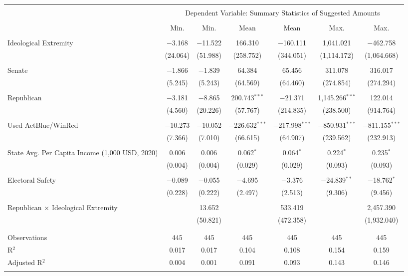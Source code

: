 
\begin{tabular}{@{\extracolsep{5pt}}lcccccc} 
\\[-1.8ex]\hline 
\hline \\[-1.8ex] 
 & \multicolumn{6}{c}{Dependent Variable: Summary Statistics of Suggested Amounts} \\ 
\cline{2-7} 
\\[-1.8ex] & Min. & Min. & Mean & Mean & Max. & Max. \\ 
\hline \\[-1.8ex] 
 Ideological Extremity & $-$3.168 & $-$11.522 & 166.310 & $-$160.111 & 1,041.021 & $-$462.758 \\ 
  & (24.064) & (51.988) & (258.752) & (344.051) & (1,114.172) & (1,064.668) \\ 
  & & & & & & \\ 
 Senate & $-$1.866 & $-$1.839 & 64.384 & 65.456 & 311.078 & 316.017 \\ 
  & (5.245) & (5.243) & (64.569) & (64.460) & (274.854) & (274.294) \\ 
  & & & & & & \\ 
 Republican & $-$3.181 & $-$8.865 & 200.743$^{***}$ & $-$21.371 & 1,145.266$^{***}$ & 122.014 \\ 
  & (4.560) & (20.226) & (57.767) & (214.835) & (238.500) & (914.764) \\ 
  & & & & & & \\ 
 Used ActBlue/WinRed & $-$10.273 & $-$10.052 & $-$226.632$^{***}$ & $-$217.998$^{***}$ & $-$850.931$^{***}$ & $-$811.155$^{***}$ \\ 
  & (7.366) & (7.010) & (66.615) & (64.907) & (239.562) & (232.913) \\ 
  & & & & & & \\ 
 State Avg. Per Capita Income (1,000 USD, 2020) & 0.006 & 0.006 & 0.062$^{*}$ & 0.064$^{*}$ & 0.224$^{*}$ & 0.235$^{*}$ \\ 
  & (0.004) & (0.004) & (0.029) & (0.029) & (0.093) & (0.093) \\ 
  & & & & & & \\ 
 Electoral Safety & $-$0.089 & $-$0.055 & $-$4.695 & $-$3.376 & $-$24.839$^{**}$ & $-$18.762$^{*}$ \\ 
  & (0.228) & (0.222) & (2.497) & (2.513) & (9.306) & (9.456) \\ 
  & & & & & & \\ 
 Republican $\times$ Ideological Extremity &  & 13.652 &  & 533.419 &  & 2,457.390 \\ 
  &  & (50.821) &  & (472.358) &  & (1,932.040) \\ 
  & & & & & & \\ 
\hline \\[-1.8ex] 
Observations & 445 & 445 & 445 & 445 & 445 & 445 \\ 
R$^{2}$ & 0.017 & 0.017 & 0.104 & 0.108 & 0.154 & 0.159 \\ 
Adjusted R$^{2}$ & 0.004 & 0.001 & 0.091 & 0.093 & 0.143 & 0.146 \\ 
\hline 
\hline \\[-1.8ex] 
\end{tabular} 
